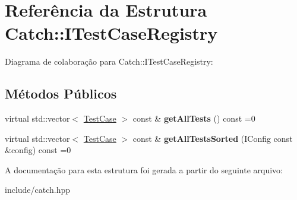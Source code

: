 \hypertarget{structCatch_1_1ITestCaseRegistry}{}\section{Referência da Estrutura Catch\+:\+:I\+Test\+Case\+Registry}
\label{structCatch_1_1ITestCaseRegistry}


Diagrama de colaboração para Catch\+:\+:I\+Test\+Case\+Registry\+:
\subsection*{Métodos Públicos}
\begin{DoxyCompactItemize}
\item 
virtual std\+::vector$<$ \hyperlink{classCatch_1_1TestCase}{Test\+Case} $>$ const \& {\bfseries get\+All\+Tests} () const =0\hypertarget{structCatch_1_1ITestCaseRegistry_ad6e4d4a621655123f73ae98cfeda063d}{}\label{structCatch_1_1ITestCaseRegistry_ad6e4d4a621655123f73ae98cfeda063d}

\item 
virtual std\+::vector$<$ \hyperlink{classCatch_1_1TestCase}{Test\+Case} $>$ const \& {\bfseries get\+All\+Tests\+Sorted} (I\+Config const \&config) const =0\hypertarget{structCatch_1_1ITestCaseRegistry_a33e46639d0319d35497c05bb5d02be5a}{}\label{structCatch_1_1ITestCaseRegistry_a33e46639d0319d35497c05bb5d02be5a}

\end{DoxyCompactItemize}


A documentação para esta estrutura foi gerada a partir do seguinte arquivo\+:\begin{DoxyCompactItemize}
\item 
include/catch.\+hpp\end{DoxyCompactItemize}
